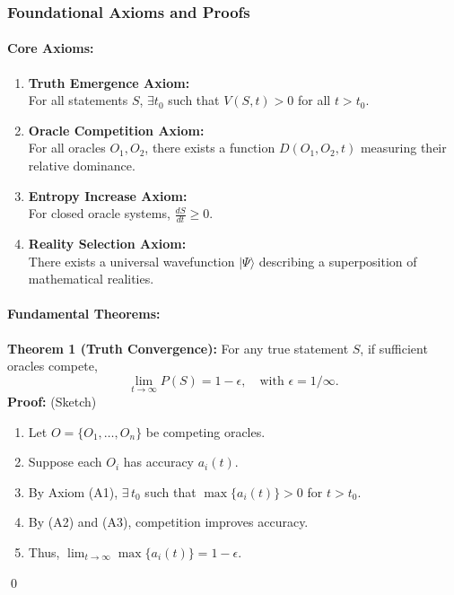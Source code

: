 \documentclass[11pt]{article}
\begin{document}
\subsubsection{Foundational Axioms and Proofs}

\paragraph{Core Axioms:}
\begin{enumerate}[label=(A\arabic*)]
    \item \textbf{Truth Emergence Axiom:} \\
    For all statements $S$, $\exists t_0$ such that $V(S,t)>0$ for all $t>t_0$.
    \item \textbf{Oracle Competition Axiom:} \\
    For all oracles $O_1, O_2$, there exists a function $D(O_1,O_2,t)$ measuring their relative dominance.
    \item \textbf{Entropy Increase Axiom:} \\
    For closed oracle systems, $\displaystyle \frac{dS}{dt}\ge 0$.
    \item \textbf{Reality Selection Axiom:} \\
    There exists a universal wavefunction $|\Psi\rangle$ describing a superposition of mathematical realities.
\end{enumerate}

\paragraph{Fundamental Theorems:}

\textbf{Theorem 1 (Truth Convergence):} For any true statement $S$, if sufficient oracles compete,
\[
\lim_{t\to\infty} P(S)=1-\epsilon, \quad \text{with } \epsilon=1/\infty.
\]
\noindent\textbf{Proof:} (Sketch)
\begin{enumerate}[label=(\roman*)]
    \item Let $O=\{O_1,\dots, O_n\}$ be competing oracles.
    \item Suppose each $O_i$ has accuracy $a_i(t)$.
    \item By Axiom (A1), $\exists\,t_0$ such that $\max\{a_i(t)\}>0$ for $t>t_0$.
    \item By (A2) and (A3), competition improves accuracy.
    \item Thus, $\displaystyle \lim_{t\to\infty} \max\{a_i(t)\}=1-\epsilon$.
\end{enumerate}
\qed
\end{document}
